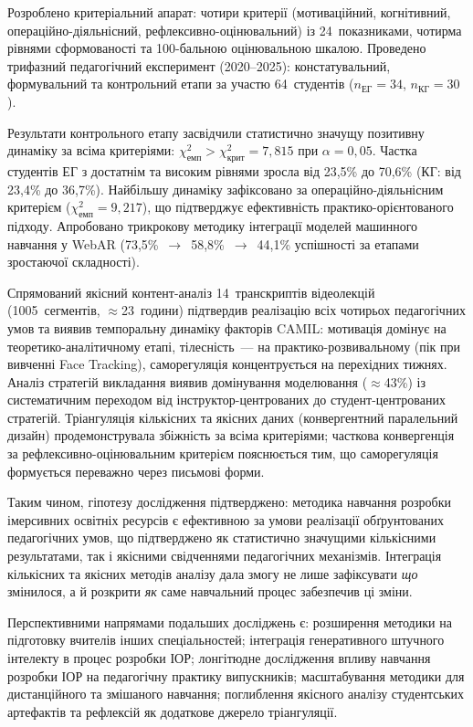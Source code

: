 \begin{enumerate}
Розроблено критеріальний апарат: чотири критерії (мотиваційний, когнітивний, операційно-діяльнісний, рефлексивно-оцінювальний) із 24~показниками, чотирма рівнями сформованості та 100-бальною оцінювальною шкалою. Проведено трифазний педагогічний експеримент (2020--2025): констатувальний, формувальний та контрольний етапи за участю 64~студентів ($n_{\text{ЕГ}} = 34$, $n_{\text{КГ}} = 30$).

Результати контрольного етапу засвідчили статистично значущу позитивну динаміку за всіма критеріями: $\chi^2_{\text{емп}} > \chi^2_{\text{крит}} = 7{,}815$ при $\alpha = 0{,}05$. Частка студентів ЕГ з достатнім та високим рівнями зросла від 23,5\% до 70,6\% (КГ: від 23,4\% до 36,7\%). Найбільшу динаміку зафіксовано за операційно-діяльнісним критерієм ($\chi^2_{\text{емп}} = 9{,}217$), що підтверджує ефективність практико-орієнтованого підходу. Апробовано трикрокову методику інтеграції моделей машинного навчання у WebAR (73,5\%~$\to$~58,8\%~$\to$~44,1\% успішності за етапами зростаючої складності).

Спрямований якісний контент-аналіз 14~транскриптів відеолекцій (1005~сегментів, $\approx$23~години) підтвердив реалізацію всіх чотирьох педагогічних умов та виявив темпоральну динаміку факторів CAMIL: мотивація домінує на теоретико-аналітичному етапі, тілесність~--- на практико-розвивальному (пік при вивченні Face Tracking), саморегуляція концентрується на перехідних тижнях. Аналіз стратегій викладання виявив домінування моделювання ($\approx$43\%) із систематичним переходом від інструктор-центрованих до студент-центрованих стратегій. Тріангуляція кількісних та якісних даних (конвергентний паралельний дизайн) продемонструвала збіжність за всіма критеріями; часткова конвергенція за рефлексивно-оцінювальним критерієм пояснюється тим, що саморегуляція формується переважно через письмові форми.

\end{enumerate}

Таким чином, гіпотезу дослідження підтверджено: методика навчання розробки імерсивних освітніх ресурсів є ефективною за умови реалізації обґрунтованих педагогічних умов, що підтверджено як статистично значущими кількісними результатами, так і якісними свідченнями педагогічних механізмів. Інтеграція кількісних та якісних методів аналізу дала змогу не лише зафіксувати \textit{що} змінилося, а й розкрити \textit{як} саме навчальний процес забезпечив ці зміни.

Перспективними напрямами подальших досліджень є: розширення методики на підготовку вчителів інших спеціальностей; інтеграція генеративного штучного інтелекту в процес розробки ІОР; лонгітюдне дослідження впливу навчання розробки ІОР на педагогічну практику випускників; масштабування методики для дистанційного та змішаного навчання; поглиблення якісного аналізу студентських артефактів та рефлексій як додаткове джерело тріангуляції.

\label{end_main_text}
